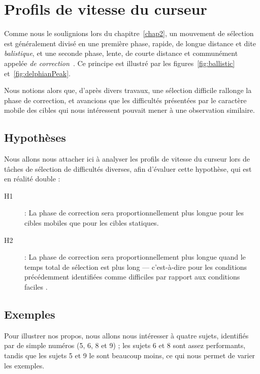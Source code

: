 \section{Profils de vitesse du curseur}
	Comme nous le soulignions lors du chapitre~\ref{chap2}, un mouvement de sélection est généralement divisé en une première phase, rapide, de longue distance et dite \emph{balistique}, et une seconde phase, lente, de courte distance et communément appelée \emph{de correction}~\cite{mackenzie1987three, crossman1983feedback}. Ce principe est illustré par les figures~\ref{fig:ballistic} et~\ref{fig:delphianPeak}.
	
	Nous notions alors que, d'après divers travaux, une sélection difficile rallonge la phase de correction, et avancions que les difficultés présentées par le caractère mobile des cibles qui nous intéressent pouvait mener à une observation similaire.
	
	\subsection{Hypothèses}
	Nous allons nous attacher ici à analyser les profils de vitesse du curseur lors de tâches de sélection de difficultés diverses, afin d'évaluer cette hypothèse, qui est en réalité double :
	
	\begin{description}
		\item[H1] : La phase de correction sera proportionnellement plus longue pour les cibles mobiles que pour les cibles statiques.
		\item[H2] : La phase de correction sera proportionnellement plus longue quand le temps total de sélection est plus long --- c'est-à-dire pour les conditions précédemment identifiées comme \og difficiles \fg{} par rapport aux conditions \og faciles \fg{}.
	\end{description}
	
	\subsection{Exemples}
	Pour illustrer nos propos, nous allons nous intéresser à quatre sujets, identifiés par de simple numéros (5, 6, 8 et 9) ; les sujets 6 et 8 sont assez performants, tandis que les sujets 5 et 9 le sont beaucoup moins, ce qui nous permet de varier les exemples.
	
